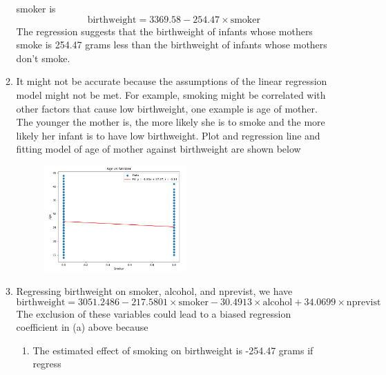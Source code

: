 \documentclass{uofa-eng-assignment}
\begin{document}
\begin{enumerate}
\begin{enumerate}
                  smoker is
                  \begin{equation*}
                      \text{birthweight} = 3369.58 - 254.47 \times \text{smoker}
                  \end{equation*}
                  The regression suggests that the birthweight of infants whose mothers smoke is
                  254.47 grams less than the birthweight of infants whose mothers don't smoke.
            \item It might not be accurate because the assumptions of the linear regression model
                  might not be met. For example, smoking might be correlated with other factors
                  that cause low birthweight, one example is age of mother. The younger the
                  mother is, the more likely she is to smoke and the more likely her infant is to
                  have low birthweight. Plot and regression line and fitting model of age of
                  mother against birthweight are shown below \\
                  \begin{figure}[H]
                      \centering
                      \includegraphics[width=0.55\textwidth]{smo-age.png}
                  \end{figure}
            \item Regressing birthweight on smoker, alcohol, and nprevist, we have
                  \begin{equation*}
                      \text{birthweight} = 3051.2486 - 217.5801 \times \text{smoker} - 30.4913 \times \text{alcohol} + 34.0699 \times \text{nprevist}
                  \end{equation*}
                  The exclusion of these variables could lead to a biased regression coefficient
                  in (a) above because
                  \begin{enumerate}
                      \item The estimated effect of smoking on birthweight is -254.47 grams if regress

\end{enumerate}
\end{enumerate}
\end{enumerate}
\end{document}
